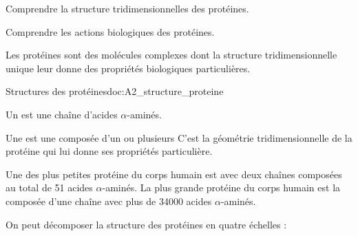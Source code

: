 \teteTermStssBiom

\vspace*{-34pt}

\begin{objectifs}
  \item Comprendre la structure tridimensionnelles des protéines.
  \item Comprendre les actions biologiques des protéines.
\end{objectifs}

\begin{contexte}
  Les protéines sont des molécules complexes dont la structure tridimensionnelle unique leur donne des propriétés biologiques particulières.
  
\end{contexte}


\begin{doc}{Structures des protéines}{doc:A2_structure_proteine}
  \phantom{b}\vspace*{-20pt}
  
  \begin{importants}
    Un  est une chaîne d'acides $\alpha$-aminés.
    
    Une  est une  composée d'un ou plusieurs 
    C'est la géométrie tridimensionnelle de la protéine qui lui donne ses propriétés particulière.
  \end{importants}
  
  Une des plus petites protéine du corps humain est  avec deux chaînes composées au total de 51 acides $\alpha$-aminés.
  La plus grande protéine du corps humain est la  composée d'une chaîne avec plus de \num{34000} acides $\alpha$-aminés.

  On peut décomposer la structure des protéines en quatre échelles :
  \begin{center}
  \end{center}
\end{doc}

